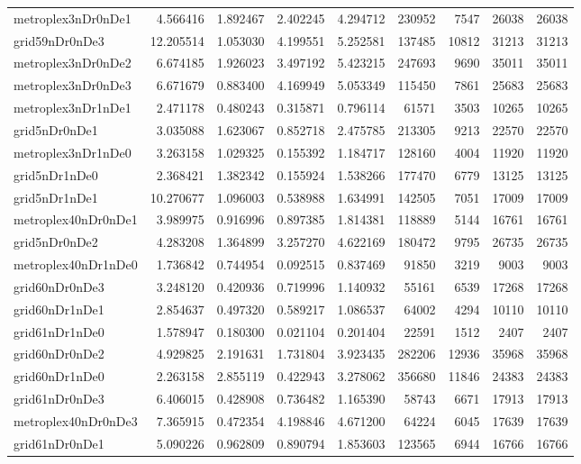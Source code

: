 \begin{longtable}{|l|r|r|r|r|r|r|r|r|}
metroplex3nDr0nDe1 & 4.566416 & 1.892467 & 2.402245 & 4.294712 & 230952 & 7547 & 26038 & 26038 \\
grid59nDr0nDe3 & 12.205514 & 1.053030 & 4.199551 & 5.252581 & 137485 & 10812 & 31213 & 31213 \\
metroplex3nDr0nDe2 & 6.674185 & 1.926023 & 3.497192 & 5.423215 & 247693 & 9690 & 35011 & 35011 \\
metroplex3nDr0nDe3 & 6.671679 & 0.883400 & 4.169949 & 5.053349 & 115450 & 7861 & 25683 & 25683 \\
metroplex3nDr1nDe1 & 2.471178 & 0.480243 & 0.315871 & 0.796114 & 61571 & 3503 & 10265 & 10265 \\
grid5nDr0nDe1 & 3.035088 & 1.623067 & 0.852718 & 2.475785 & 213305 & 9213 & 22570 & 22570 \\
metroplex3nDr1nDe0 & 3.263158 & 1.029325 & 0.155392 & 1.184717 & 128160 & 4004 & 11920 & 11920 \\
grid5nDr1nDe0 & 2.368421 & 1.382342 & 0.155924 & 1.538266 & 177470 & 6779 & 13125 & 13125 \\
grid5nDr1nDe1 & 10.270677 & 1.096003 & 0.538988 & 1.634991 & 142505 & 7051 & 17009 & 17009 \\
metroplex40nDr0nDe1 & 3.989975 & 0.916996 & 0.897385 & 1.814381 & 118889 & 5144 & 16761 & 16761 \\
grid5nDr0nDe2 & 4.283208 & 1.364899 & 3.257270 & 4.622169 & 180472 & 9795 & 26735 & 26735 \\
metroplex40nDr1nDe0 & 1.736842 & 0.744954 & 0.092515 & 0.837469 & 91850 & 3219 & 9003 & 9003 \\
grid60nDr0nDe3 & 3.248120 & 0.420936 & 0.719996 & 1.140932 & 55161 & 6539 & 17268 & 17268 \\
grid60nDr1nDe1 & 2.854637 & 0.497320 & 0.589217 & 1.086537 & 64002 & 4294 & 10110 & 10110 \\
grid61nDr1nDe0 & 1.578947 & 0.180300 & 0.021104 & 0.201404 & 22591 & 1512 & 2407 & 2407 \\
grid60nDr0nDe2 & 4.929825 & 2.191631 & 1.731804 & 3.923435 & 282206 & 12936 & 35968 & 35968 \\
grid60nDr1nDe0 & 2.263158 & 2.855119 & 0.422943 & 3.278062 & 356680 & 11846 & 24383 & 24383 \\
grid61nDr0nDe3 & 6.406015 & 0.428908 & 0.736482 & 1.165390 & 58743 & 6671 & 17913 & 17913 \\
metroplex40nDr0nDe3 & 7.365915 & 0.472354 & 4.198846 & 4.671200 & 64224 & 6045 & 17639 & 17639 \\
grid61nDr0nDe1 & 5.090226 & 0.962809 & 0.890794 & 1.853603 & 123565 & 6944 & 16766 & 16766 \\

\end{longtable}
